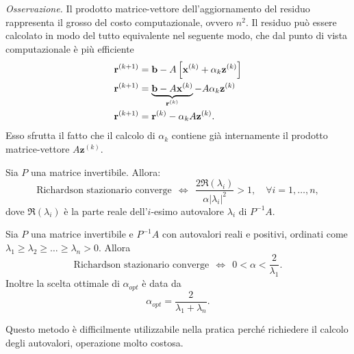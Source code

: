 \textit{Osservazione.} Il prodotto matrice-vettore dell'aggiornamento del residuo rappresenta il grosso del costo computazionale, ovvero $n^{2}$. Il residuo può essere calcolato in modo del tutto equivalente nel seguente modo, che dal punto di vista computazionale è più efficiente
\begin{align*}
\mathbf{r}^{( k+1)} & =\mathbf{b} -A\left[\mathbf{x}^{(k)} +\alpha _{k}\mathbf{z}^{(k)}\right]\\
\mathbf{r}^{( k+1)} & =\underbrace{\mathbf{b} -A\mathbf{x}^{(k)}}_{\mathbf{r}^{(k)}} -A\alpha _{k}\mathbf{z}^{(k)}\\
\mathbf{r}^{( k+1)} & =\mathbf{r}^{(k)} -\alpha _{k} A\mathbf{z}^{(k)}.
\end{align*}
Esso sfrutta il fatto che il calcolo di $\alpha _{k}$ contiene già internamente il prodotto matrice-vettore $A\mathbf{z}^{(k)}$.
\begin{theorem}
Sia $P$ una matrice invertibile. Allora:
\begin{equation*}
\text{Richardson stazionario converge} \ \ \Leftrightarrow \ \ \frac{2\Re ( \lambda _{i})}{\alpha |\lambda _{i} |^{2}}  >1,\quad \forall i=1,\dotsc ,n,
\end{equation*}
dove $\Re ( \lambda _{i})$ è la parte reale dell'$i$-esimo autovalore $\lambda_i$ di $P^{-1} A$.
\end{theorem}
\begin{theorem}
Sia $P$ una matrice invertibile e $P^{-1} A$ con autovalori reali e positivi, ordinati come $\lambda _{1} \geqslant \lambda _{2} \geqslant \dotsc \geqslant \lambda _{n}  >0$. Allora
\begin{equation*}
\text{Richardson stazionario converge} \ \ \Leftrightarrow \ \ 0< \alpha < \frac{2}{\lambda _{1}} .
\end{equation*}
Inoltre la scelta ottimale di $\alpha _{opt}$ è data da
\begin{equation*}
\alpha _{opt} =\frac{2}{\lambda _{1} +\lambda _{n}} .
\end{equation*}
\end{theorem}
Questo metodo è difficilmente utilizzabile nella pratica perché richiedere il calcolo degli autovalori, operazione molto costosa.
